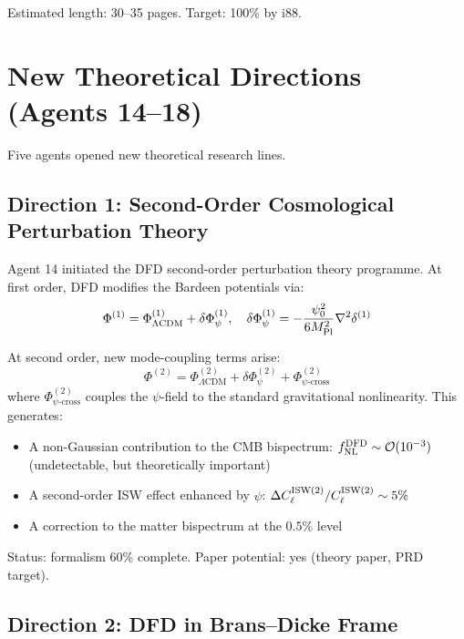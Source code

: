 \documentclass[11pt,a4paper]{article}
\begin{document}
Estimated length: 30--35 pages. Target: 100\% by i88.

\section{New Theoretical Directions (Agents 14--18)}

Five agents opened new theoretical research lines.

\subsection{Direction 1: Second-Order Cosmological Perturbation Theory}

Agent 14 initiated the DFD second-order perturbation theory programme. At first order, DFD modifies the Bardeen potentials via:
\begin{equation}
\Phi^{(1)} = \Phi^{(1)}_{\Lambda\text{CDM}} + \delta\Phi^{(1)}_\psi, \quad \delta\Phi^{(1)}_\psi = -\frac{\psi_0^2}{6 M_{\rm Pl}^2} \nabla^2 \delta^{(1)}
\end{equation}

At second order, new mode-coupling terms arise:
\begin{equation}
\Phi^{(2)} = \Phi^{(2)}_{\Lambda\text{CDM}} + \delta\Phi^{(2)}_\psi + \Phi^{(2)}_{\psi\text{-cross}}
\end{equation}
where $\Phi^{(2)}_{\psi\text{-cross}}$ couples the $\psi$-field to the standard gravitational nonlinearity. This generates:
\begin{itemize}[nosep]
\item A non-Gaussian contribution to the CMB bispectrum: $f_{\rm NL}^{\rm DFD} \sim \mathcal{O}(10^{-3})$ (undetectable, but theoretically important)
\item A second-order ISW effect enhanced by $\psi$: $\Delta C_\ell^{\rm ISW(2)} / C_\ell^{\rm ISW(2)} \sim 5\%$
\item A correction to the matter bispectrum at the $0.5\%$ level
\end{itemize}

Status: formalism 60\% complete. Paper potential: yes (theory paper, PRD target).

\subsection{Direction 2: DFD in Brans--Dicke Frame}
\end{document}
